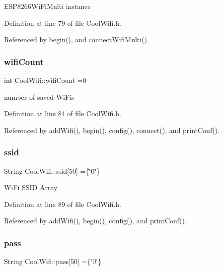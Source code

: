 E\+S\+P8266\+Wi\+Fi\+Multi instance 

Definition at line 79 of file Cool\+Wifi.\+h.



Referenced by begin(), and connect\+Wifi\+Multi().

\mbox{\label{class_cool_wifi_ab133bd92fcb895b884deecd6678592e4}} 
\subsubsection{\texorpdfstring{wifi\+Count}{wifiCount}}
{\footnotesize\ttfamily int Cool\+Wifi\+::wifi\+Count =0\hspace{0.3cm}{\ttfamily [private]}}

number of saved Wi\+Fi\textquotesingle{}s 

Definition at line 84 of file Cool\+Wifi.\+h.



Referenced by add\+Wifi(), begin(), config(), connect(), and print\+Conf().

\mbox{\label{class_cool_wifi_a893b21d0fed821438733bba2e73fb4c2}} 
\subsubsection{\texorpdfstring{ssid}{ssid}}
{\footnotesize\ttfamily String Cool\+Wifi\+::ssid\mbox{[}50\mbox{]} =\{\char`\"{}0\char`\"{}\}\hspace{0.3cm}{\ttfamily [private]}}

Wi\+Fi S\+S\+ID Array 

Definition at line 89 of file Cool\+Wifi.\+h.



Referenced by add\+Wifi(), begin(), config(), and print\+Conf().

\mbox{\label{class_cool_wifi_a0c3332a149245aaad060b32593a54c9b}} 
\subsubsection{\texorpdfstring{pass}{pass}}
{\footnotesize\ttfamily String Cool\+Wifi\+::pass\mbox{[}50\mbox{]} =\{\char`\"{}0\char`\"{}\}\hspace{0.3cm}{\ttfamily [private]}}

